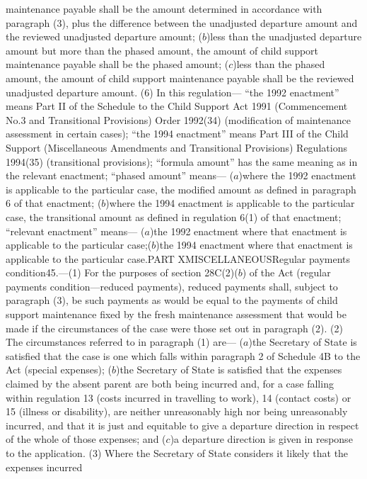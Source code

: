 \documentclass[a4paper]{article}
\begin{document}
maintenance payable shall be the amount determined in accordance with paragraph
(3), plus the difference between the unadjusted departure amount and the
reviewed unadjusted departure amount;
($b$)less than the unadjusted departure amount but more than the phased amount,
the amount of child support maintenance payable shall be the phased amount;
($c$)less than the phased amount, the amount of child support maintenance payable
shall be the reviewed unadjusted departure amount.
(6) In this regulation—
“the 1992 enactment” means Part II of the Schedule to the Child Support Act 1991
(Commencement No.3 and Transitional Provisions) Order 1992(34) (modification of
maintenance assessment in certain cases);
“the 1994 enactment” means Part III of the Child Support (Miscellaneous
Amendments and Transitional Provisions) Regulations 1994(35) (transitional
provisions);
“formula amount” has the same meaning as in the relevant enactment;
“phased amount” means—
($a$)where the 1992 enactment is applicable to the particular case, the modified
amount as defined in paragraph 6 of that enactment;
($b$)where the 1994 enactment is applicable to the particular case, the
transitional amount as defined in regulation 6(1) of that enactment;
“relevant enactment” means—
($a$)the 1992 enactment where that enactment is applicable to the particular case;($b$)the 1994 enactment where that enactment is applicable to the particular case.PART XMISCELLANEOUSRegular payments condition45.—(1) For the purposes of section
28C(2)($b$) of the Act (regular payments condition—reduced payments), reduced
payments shall, subject to paragraph (3), be such payments as would be equal to
the payments of child support maintenance fixed by the fresh maintenance
assessment that would be made if the circumstances of the case were those set
out in paragraph (2).
(2) The circumstances referred to in paragraph (1) are—
($a$)the Secretary of State is satisfied that the case is one which falls within
paragraph 2 of Schedule 4B to the Act (special expenses);
($b$)the Secretary of State is satisfied that the expenses claimed by the absent
parent are both being incurred and, for a case falling within regulation 13
(costs incurred in travelling to work), 14 (contact costs) or 15 (illness or
disability), are neither unreasonably high nor being unreasonably incurred, and
that it is just and equitable to give a departure direction in respect of the
whole of those expenses; and
($c$)a departure direction is given in response to the application.
(3) Where the Secretary of State considers it likely that the expenses incurred
\end{document}
